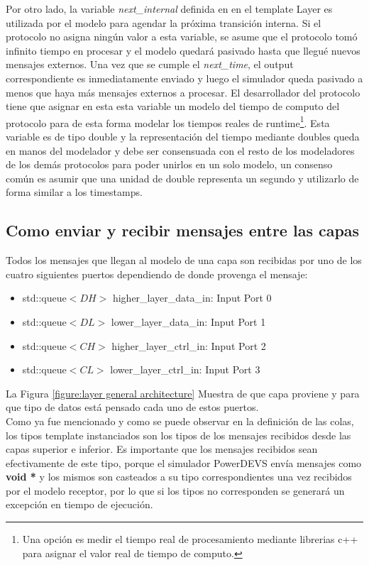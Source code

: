 \documentclass[10pt,a4paper]{article}
\begin{document}
Por otro lado, la variable \textit{next\_internal} definida en en el template Layer es utilizada por el modelo para agendar la próxima transición interna. Si el protocolo no asigna ningún valor a esta variable, se asume que el protocolo tomó infinito tiempo en procesar y el modelo quedará pasivado hasta que llegué nuevos mensajes externos. Una vez que se cumple el \textit{next\_time}, el output correspondiente es inmediatamente enviado y luego el simulador queda pasivado a menos que haya más mensajes externos a procesar. El desarrollador del protocolo tiene que asignar en esta esta variable un modelo del tiempo de computo del protocolo para de esta forma modelar los tiempos reales de runtime\footnote{Una opción es medir el tiempo real de procesamiento mediante librerias c++ para asignar el valor real de tiempo de computo.}. Esta variable es de tipo double y la representación del tiempo mediante doubles queda en manos del modelador y debe ser consensuada con el resto de los modeladores de los demás protocolos para poder unirlos en un solo modelo, un consenso común es asumir que una unidad de double representa un segundo y utilizarlo de forma similar a los timestamps. \\

\subsection{Como enviar y recibir mensajes entre las capas}

Todos los mensajes que llegan al modelo de una capa son recibidas por uno de los cuatro siguientes puertos dependiendo de donde provenga el mensaje:
\begin{itemize}
\item std::queue$<DH>$ higher\_layer\_data\_in:  Input Port 0
\item std::queue$<DL>$ lower\_layer\_data\_in:   Input Port 1
\item std::queue$<CH>$ higher\_layer\_ctrl\_in:  Input Port 2 
\item std::queue$<CL>$ lower\_layer\_ctrl\_in:   Input Port 3
\end{itemize}

La Figura \ref{figure:layer general architecture} Muestra de que capa proviene y para que tipo de datos está pensado cada uno de estos puertos. \\

Como ya fue mencionado y como se puede observar en la definición de las colas, los tipos template instanciados son los tipos de los mensajes recibidos desde las capas superior e inferior. Es importante que los mensajes recibidos sean efectivamente de este tipo, porque el simulador PowerDEVS envía mensajes como \textbf{void *} y los mismos son casteados a su tipo correspondientes una vez recibidos por el modelo receptor, por lo que si los tipos no corresponden se generará un excepción en tiempo de ejecución. \\
\end{document}
